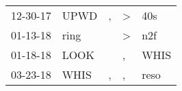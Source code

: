 \begin{supertabular}{p{0.07\textwidth}p{0.06\textwidth}p{0.02\textwidth}p{0.02\textwidth}p{0.06\textwidth}}
 12-30-17\textsuperscript{} &  UPWD\textsuperscript{} &  , &  \textgreater &   40s\textsuperscript{} \\
 01-13-18\textsuperscript{} &  ring\textsuperscript{} &    &  \textgreater &   n2f\textsuperscript{} \\
 01-18-18\textsuperscript{} &  LOOK\textsuperscript{} &    &             , &  WHIS\textsuperscript{} \\
 03-23-18\textsuperscript{} &  WHIS\textsuperscript{} &  , &             , &  reso\textsuperscript{} \\
\end{supertabular}
